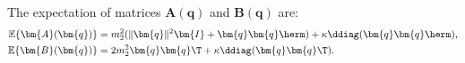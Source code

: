 The expectation of matrices $\bm{A}(\bm{q})$ and $\bm{B}(\bm{q})$ are:
\begin{align}
	\mathbb{E}\{\bm{A}(\bm{q})\}&=m_2^2(\|\bm{q}\|^2\bm{I} +\bm{q}\bm{q}\herm) + \kappa\ddiag(\bm{q}\bm{q}\herm),\nonumber\\
	\mathbb{E}\{\bm{B}(\bm{q})\}&=2  m_2^2\bm{q}\bm{q}\T+\kappa\ddiag(\bm{q}\bm{q}\T).\nonumber
\end{align}

